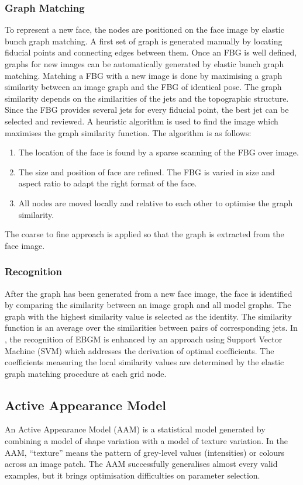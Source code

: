 \subsubsection{Graph Matching}
To represent a new face, the nodes are positioned on the face image by elastic bunch graph matching. A first set of graph is generated manually by locating fiducial points and connecting edges between them. Once an FBG is well defined, graphs for new images can be automatically generated by elastic bunch graph matching. Matching a FBG with a new image is done by maximising a graph similarity between an image graph and the FBG of identical pose. The graph similarity depends on the similarities of the jets and the topographic structure. Since the FBG provides several jets for every fiducial point, the best jet can be selected and reviewed. A heuristic algorithm is used to find the image which maximises the graph similarity function. The algorithm is as follows:
\begin{enumerate}
 \item The location of the face is found by a sparse scanning of the FBG over image.
 \item The size and position of face are refined. The FBG is varied in size and aspect ratio to adapt the right format of the face.
 \item All nodes are moved locally and relative to each other to optimise the graph similarity.
\end{enumerate}
The coarse to fine approach is applied so that the graph is extracted from the face image.
\subsubsection{Recognition}
After the graph has been generated from a new face image, the face is identified by comparing the similarity between an image graph and all model graphs. The graph with the highest similarity value is selected as the identity. The similarity function is an average over the similarities between pairs of corresponding jets. In \cite{Tefas2001}, the recognition of EBGM is enhanced by an approach using Support Vector Machine (SVM) which addresses the derivation of optimal coefficients. The coefficients measuring the local similarity values are determined by the elastic graph matching procedure at each grid node.

\subsection{Active Appearance Model}
An Active Appearance Model (AAM) is a statistical model generated by combining a model of shape variation with a model of texture variation. In the AAM, ``texture'' means the pattern of grey-level values (intensities) or colours across an image patch. The AAM successfully generalises almost every valid examples, but it brings optimisation difficulties on parameter selection. 
